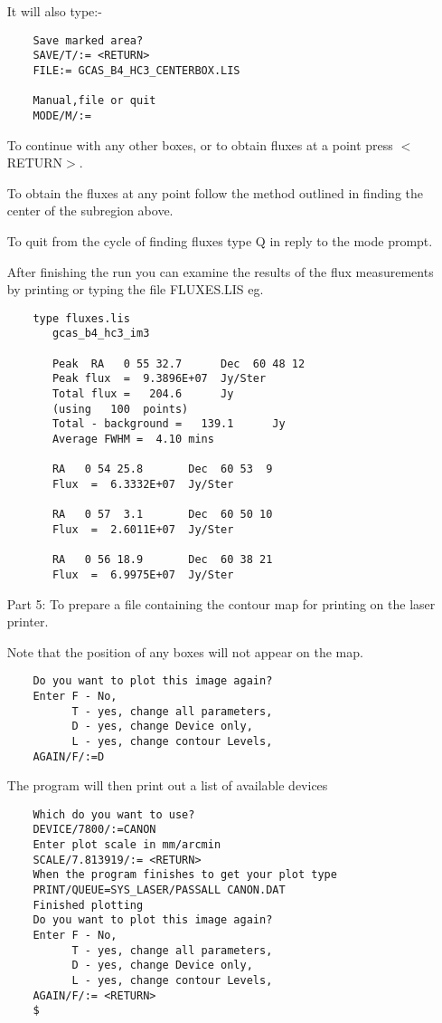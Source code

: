 \begin{itemize}
It will also type:-
\begin{verbatim}
    Save marked area?
    SAVE/T/:= <RETURN>
    FILE:= GCAS_B4_HC3_CENTERBOX.LIS

    Manual,file or quit
    MODE/M/:= 
\end{verbatim}

To continue with any other boxes, or to obtain fluxes at a point press 
$<$RETURN$>$.

To obtain the fluxes at any point follow the method outlined in finding the
center of the subregion above.
              
To quit from the cycle of finding fluxes type Q in reply to the mode prompt.

After finishing the run you can examine the results of the flux measurements
by printing or typing the file FLUXES.LIS eg.

\begin{verbatim}
    type fluxes.lis
       gcas_b4_hc3_im3

       Peak  RA   0 55 32.7      Dec  60 48 12
       Peak flux  =  9.3896E+07  Jy/Ster
       Total flux =   204.6      Jy
       (using   100  points)
       Total - background =   139.1      Jy
       Average FWHM =  4.10 mins

       RA   0 54 25.8       Dec  60 53  9
       Flux  =  6.3332E+07  Jy/Ster

       RA   0 57  3.1       Dec  60 50 10
       Flux  =  2.6011E+07  Jy/Ster

       RA   0 56 18.9       Dec  60 38 21
       Flux  =  6.9975E+07  Jy/Ster
\end{verbatim}

\pagebreak
\item [Part 5:] To prepare a file containing the contour map for printing on the
laser printer.

Note that the position of any boxes will not appear on the map.

\begin{verbatim}
    Do you want to plot this image again?
    Enter F - No,
          T - yes, change all parameters,
          D - yes, change Device only,
          L - yes, change contour Levels,
    AGAIN/F/:=D
\end{verbatim}

The program will then print out a list of available devices

\begin{verbatim}
    Which do you want to use?
    DEVICE/7800/:=CANON
    Enter plot scale in mm/arcmin
    SCALE/7.813919/:= <RETURN>
    When the program finishes to get your plot type
    PRINT/QUEUE=SYS_LASER/PASSALL CANON.DAT
    Finished plotting
    Do you want to plot this image again?
    Enter F - No,
          T - yes, change all parameters,
          D - yes, change Device only,
          L - yes, change contour Levels,
    AGAIN/F/:= <RETURN>
    $
\end{verbatim}
                   

\end{itemize}
